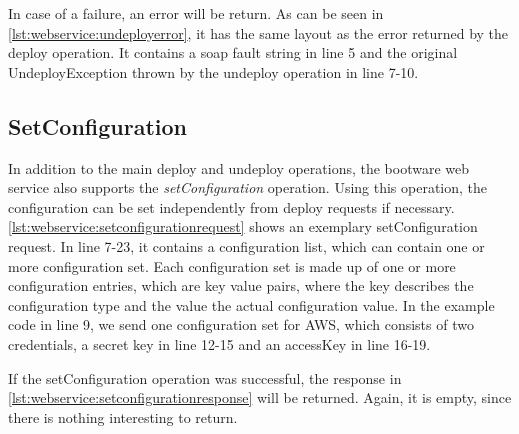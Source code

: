 In case of a failure, an error will be return.
As can be seen in \autoref{lst:webservice:undeployerror}, it has the same layout as the error returned by the deploy operation.
It contains a soap fault string in line 5 and the original UndeployException thrown by the undeploy operation in line 7-10.

\vspace*{\baselineskip}

\subsection{SetConfiguration}

In addition to the main deploy and undeploy operations, the bootware web service also supports the \textit{setConfiguration} operation.
Using this operation, the configuration can be set independently from deploy requests if necessary.
\autoref{lst:webservice:setconfigurationrequest} shows an exemplary setConfiguration request.
In line 7-23, it contains a configuration list, which can contain one or more configuration set.
Each configuration set is made up of one or more configuration entries, which are key value pairs, where the key describes the configuration type and the value the actual configuration value.
In the example code in line 9, we send one configuration set for AWS, which consists of two credentials, a secret key in line 12-15 and an accessKey in line 16-19.

\vspace*{\baselineskip}

If the setConfiguration operation was successful, the response in \autoref{lst:webservice:setconfigurationresponse} will be returned.
Again, it is empty, since there is nothing interesting to return.

